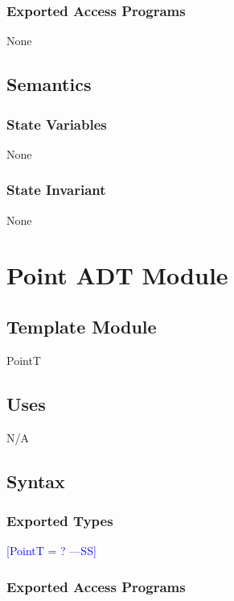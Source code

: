 \documentclass[12pt]{article}
\newcommand{\authornote}[3]{\textcolor{#1}{[#3 ---#2]}}
\newcommand{\authornote}[3]{}
\newcommand{\wss}[1]{\authornote{blue}{SS}{#1}}
\begin{document}
\subsubsection* {Exported Access Programs}

None

\subsection* {Semantics}

\subsubsection* {State Variables}

None

\subsubsection* {State Invariant}

None

\newpage

\section* {Point ADT Module}

\subsection*{Template Module}

PointT

\subsection* {Uses}

N/A

\subsection* {Syntax}

\subsubsection* {Exported Types}

\wss{PointT = ?}

\subsubsection* {Exported Access Programs}
\end{document}
